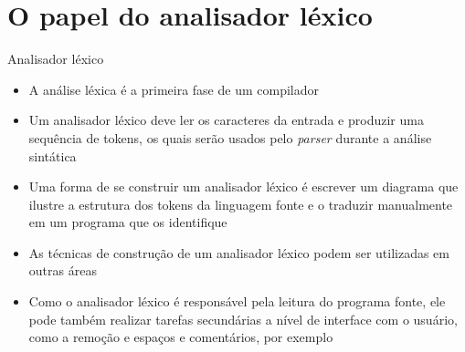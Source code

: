 \section{O papel do analisador léxico}

\begin{frame}[fragile]{Analisador léxico}

    \begin{itemize}
        \item A análise léxica é a primeira fase de um compilador

        \item Um analisador léxico deve ler os caracteres da entrada e produzir uma sequência de tokens, os quais serão usados pelo \textit{parser} durante a
            análise sintática

        \item Uma forma de se construir um analisador léxico é escrever um diagrama que ilustre a estrutura dos tokens da linguagem fonte e o traduzir manualmente
            em um programa que os identifique

        \item As técnicas de construção de um analisador léxico podem ser utilizadas em outras áreas

        \item Como o analisador léxico é responsável pela leitura do programa fonte, ele pode também realizar tarefas secundárias a nível de interface com
            o usuário, como a remoção e espaços e comentários, por exemplo
    \end{itemize}

\end{frame}

